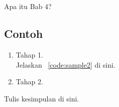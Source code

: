 \chapter{\babEmpat}
Apa itu Bab 4?


\section{Contoh}
\begin{enumerate}
	\item Tahap 1. \\ 
	Jelaskan \lst~\ref{code:sample2} di sini.

	\item Tahap 2.
\end{enumerate}

Tulis kesimpulan di sini.
